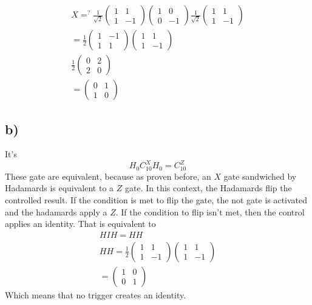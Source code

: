 \documentclass[]{article}
\begin{document}
\[
\begin{align}
X =^{?} \frac{1}{\sqrt{ 2 }}\begin{pmatrix}
1 & 1  \\
1 & -1
\end{pmatrix}\begin{pmatrix}
1 & 0 \\
0 & -1
\end{pmatrix}\frac{1}{\sqrt{ 2 }}\begin{pmatrix}
1 & 1  \\
1 & -1
\end{pmatrix} \\
=\frac{1}{2}\begin{pmatrix}
1 & -1 \\
1 & 1
\end{pmatrix}\begin{pmatrix}
1 & 1 \\
1 & -1
\end{pmatrix} \\
\frac{1}{2}\begin{pmatrix}
0 & 2 \\
2 & 0
\end{pmatrix} \\
=\begin{pmatrix}
0 & 1 \\
1 & 0
\end{pmatrix}
\end{align}
\]

\hypertarget{b}{%
\subsection{b)}\label{b}}

It's \[
H_{0}C^{X}_{10}H_{0}= C^{Z}_{10}
\] These gate are equivalent, because as proven before, an \(X\) gate
sandwiched by Hadamards is equivalent to a \(Z\) gate. In this context,
the Hadamards flip the controlled result. If the condition is met to
flip the gate, the not gate is activated and the hadamards apply a
\(Z\). If the condition to flip isn't met, then the control applies an
identity. That is equivalent to \[
\begin{align}
HIH = HH \\
HH = \frac{1}{2}\begin{pmatrix}
1 & 1  \\
1 & -1
\end{pmatrix}\begin{pmatrix}
1 & 1  \\
1 & -1
\end{pmatrix} \\
=\begin{pmatrix}
1 & 0 \\
0 & 1
\end{pmatrix}
\end{align}
\] Which means that no trigger creates an identity.
\end{document}
